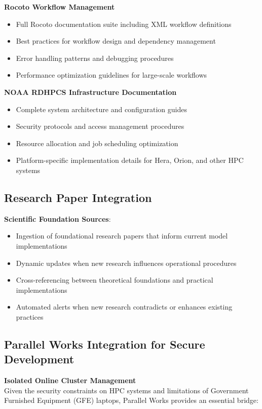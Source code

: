 \documentclass[11pt,letterpaper]{article}
\begin{document}
\textbf{Rocoto Workflow Management}
\begin{itemize}
    \item Full Rocoto documentation suite including XML workflow definitions
    \item Best practices for workflow design and dependency management
    \item Error handling patterns and debugging procedures
    \item Performance optimization guidelines for large-scale workflows
\end{itemize}

\textbf{NOAA RDHPCS Infrastructure Documentation}
\begin{itemize}
    \item Complete system architecture and configuration guides
    \item Security protocols and access management procedures
    \item Resource allocation and job scheduling optimization
    \item Platform-specific implementation details for Hera, Orion, and other HPC systems
\end{itemize}

\subsection{Research Paper Integration}
\textbf{Scientific Foundation Sources}:
\begin{itemize}
    \item Ingestion of foundational research papers that inform current model implementations
    \item Dynamic updates when new research influences operational procedures
    \item Cross-referencing between theoretical foundations and practical implementations
    \item Automated alerts when new research contradicts or enhances existing practices
\end{itemize}

\subsection{Parallel Works Integration for Secure Development}

\textbf{Isolated Online Cluster Management}\\
Given the security constraints on HPC systems and limitations of Government Furnished Equipment (GFE) laptops, Parallel Works provides an essential bridge:
\end{document}
